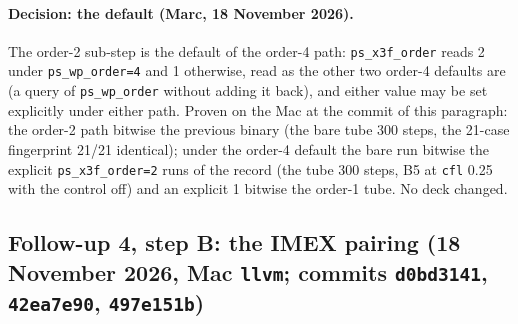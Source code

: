 \documentclass[11pt,a4paper]{article}
\newcommand{\code}[1]{\texttt{\small #1}}
\begin{document}
\paragraph{Decision: the default (Marc, 18 November 2026).}  The
order-2 sub-step is the default of the order-4 path:
\code{ps\_x3f\_order} reads 2 under \code{ps\_wp\_order=4} and 1
otherwise, read as the other two order-4 defaults are (a query of
\code{ps\_wp\_order} without adding it back), and either value may be
set explicitly under either path.  Proven on the Mac at the commit of
this paragraph: the order-2 path bitwise the previous binary (the bare
tube 300 steps, the 21-case fingerprint 21/21 identical); under the
order-4 default the bare run bitwise the explicit \code{ps\_x3f\_order=2}
runs of the record (the tube 300 steps, B5 at \code{cfl} 0.25 with the
control off) and an explicit 1 bitwise the order-1 tube.  No deck
changed.


\subsection{Follow-up 4, step B: the IMEX pairing (18 November 2026, Mac \code{llvm}; commits \code{d0bd3141}, \code{42ea7e90}, \code{497e151b})}
\label{sec:fu4b}
\end{document}
